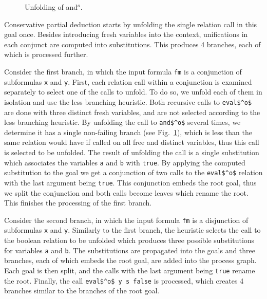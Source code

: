 \begin{figure}[!t]
  \centering
  \begin{minipage}{0.95\textwidth}
    
  \end{minipage}
  \caption{Unfolding of and$^o$.}
  \label{fig:and}
\end{figure}


Conservative partial deduction starts by unfolding the single relation call in this goal once.
Besides introducing fresh variables into the context, unifications in each conjunct are computed into substitutions.
This produces 4 branches, each of which is processed further.

Consider the first branch, in which the input formula \lstinline{fm} is a conjunction of subformulas \lstinline{x} and \lstinline{y}.
First, each relation call within a conjunction is examined separately to select one of the calls to unfold.
To do so, we unfold each of them in isolation and use the less branching heuristic.
Both recursive calls to \lstinline{eval$^o$} are done with three distinct fresh variables, and are not selected according to the less branching heuristic.
By unfolding the call to \lstinline{and$^o$} several times, we determine it has a single non-failing branch (see Fig.~\ref{fig:and}), which is less than the same relation would have if called on all free and distinct variables, thus this call is selected to be unfolded.
The result of unfolding the call is a single substitution which associates the variables \lstinline{a} and \lstinline{b} with \lstinline{true}.
By applying the computed substitution to the goal we get a conjunction of two calls to the \lstinline{eval$^o$} relation with the last argument being \lstinline{true}.
This conjunction embeds the root goal, thus we split the conjunction and both calls become leaves which rename the root.
This finishes the processing of the first branch.

Consider the second branch, in which the input formula \lstinline{fm} is a disjunction of subformulas \lstinline{x} and \lstinline{y}.
Similarly to the first branch, the heuristic selects the call to the boolean relation to be unfolded which produces three possible substitutions for variables \lstinline{a} and \lstinline{b}.
The substitutions are propagated into the goals and three branches, each of which embeds the root goal, are added into the process graph.
Each goal is then split, and the calls with the last argument being \lstinline{true} rename the root.
Finally, the call \lstinline{eval$^o$ y s false} is processed, which creates 4 branches similar to the branches of the root goal.


